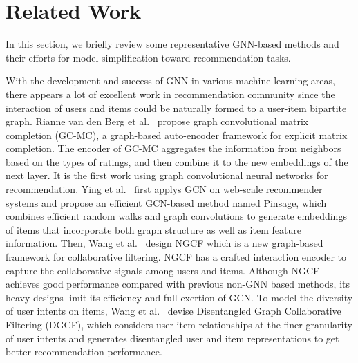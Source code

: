 \documentclass[sigconf,authorversion]{acmart}
\begin{document}
 \section{Related Work}
In this section, we briefly review some representative GNN-based methods and their efforts for model simplification toward recommendation tasks.

 With the development and success of GNN in various machine learning areas, there appears a lot of excellent work in recommendation community since the interaction of users and items could be naturally formed to a user-item bipartite graph.
 Rianne van den Berg et al.~\cite{GC-MC} propose graph convolutional matrix completion (GC-MC), a graph-based auto-encoder framework for explicit matrix completion. The encoder of GC-MC aggregates the information from neighbors based on the types of ratings, and then combine it to the new embeddings of the next layer. It is the first work using graph convolutional neural networks for recommendation. 
 Ying et al.~\cite{PinSage} first applys GCN on web-scale recommender systems and propose an efficient GCN-based method named Pinsage, which combines efficient random walks and graph convolutions
 to generate embeddings of items that incorporate both graph structure as well as item feature information.
 Then, Wang et al.~\cite{NGCF} design NGCF which is a new graph-based framework for collaborative filtering. NGCF has a crafted interaction encoder to capture the collaborative signals among users and items.  Although NGCF achieves good performance compared with previous non-GNN based methods, its heavy designs limit its efficiency and full exertion of GCN. To model the diversity of user intents on items, Wang et al.~\cite{DGCF} devise Disentangled Graph Collaborative Filtering (DGCF), which considers user-item relationships at the finer granularity of user intents and generates disentangled user and item representations to get better recommendation performance. 
 
\end{document}

